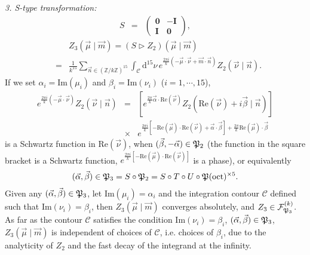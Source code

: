 \documentclass[aps,prd,notitlepage,nofootinbib,superscriptaddress,groupedaddress,twocolumn]{revtex4-1}
\def\be{\begin{eqnarray}}
\def\ee{\end{eqnarray}}
\newcommand{\cc}{\mathcal C}
\newcommand{\cf}{\mathcal F}
\newcommand{\calp}{\mathcal P}
\renewcommand{\a}{\alpha}
\renewcommand{\b}{\beta}
\newcommand{\rmd}{\mathrm d}
\newcommand{\lt}{\left}
\newcommand{\rt}{\right}
\newcommand{\act}{\rhd}
\begin{document}
\emph{3. S-type transformation:}
\be
S&=&\left(\begin{array}{cc}
\mathbf{0} & -\mathbf{I} \\
\mathbf{I} & \mathbf{0}
\end{array}\right),
\ee
\be
&&Z_3(\vec{\mu}\mid \vec{m})=(S\act Z_2)(\vec{\mu}\mid \vec{m})\label{Strans}\\
&=&\frac{1}{k^{15}} \sum_{\vec{n} \in (\mathbb{Z} / k \mathbb{Z})^{15}} \int_\cc \rmd^{15} \nu\, e^{\frac{2 \pi i}{k}\left(-\vec{\mu}\cdot\vec{\nu}+\vec{m}\cdot\vec{ n}\right)} Z_2(\vec{\nu}\mid \vec{n}).\nonumber
\ee
If we set $\a_i=\mathrm{Im}(\mu_i)$ and $\b_i=\mathrm{Im}(\nu_i)$ ($i=1,\cdots,15$),
\be
e^{\frac{2 \pi i}{k}\left(-\vec{\mu}\cdot\vec{\nu}\rt)} Z_2(\vec{\nu}\mid \vec{n})
&=& \lt[e^{\frac{2 \pi }{k}\vec{\a}\cdot\mathrm{Re}(\vec{\nu})}Z_2(\mathrm{Re}(\vec{\nu})+i\vec{\b}\mid \vec{n})\rt]\nonumber\\
&\times& e^{\frac{2\pi i}{k}\lt[-\mathrm{Re}(\vec{\mu})\cdot\mathrm{Re}(\vec{\nu})+\vec{\a}\cdot\vec{\b}\rt]+\frac{2\pi}{k}\mathrm{Re}(\vec{\mu})\cdot\vec{\b}}\nonumber
\ee
is a Schwartz function in $\mathrm{Re}(\vec{\nu})$, when $(\vec{\b},-\vec{\a})\in \Fp_2$ (the function in the square bracket is a Schwartz function, $e^{\frac{2\pi i}{k}\lt[-\mathrm{Re}(\vec{\mu})\cdot\mathrm{Re}(\vec{\nu})\rt]}$ is a phase), or equivalently
\be
(\vec{\a},\vec{\b})\in \Fp_3=S\circ \Fp_2=S\circ T\circ U\circ\Fp(\mathrm{oct})^{\times 5}.\label{STUFpoct}
\ee
Given any $(\vec{\a},\vec{\b})\in \Fp_3$, let $\mathrm{Im}(\mu_i)=\a_i$ and the integration contour $\cc$ defined such that $\mathrm{Im}(\nu_i)=\b_i$, then $Z_3(\vec{\mu}\mid \vec{m})$ converges absolutely, and $Z_3\in \cf_{\Fp_3}^{(k)}$. As far as the contour $\cc$ satisfies the condition $\mathrm{Im}(\nu_i)=\b_i$, $(\vec{\a},\vec{\b})\in \Fp_3$, $Z_3(\vec{\mu}\mid \vec{m})$ is independent of choices of $\cc$, i.e. choices of $\b_i$, due to the analyticity of $Z_2$ and the fast decay of the integrand at the infinity.\\

\end{document}
